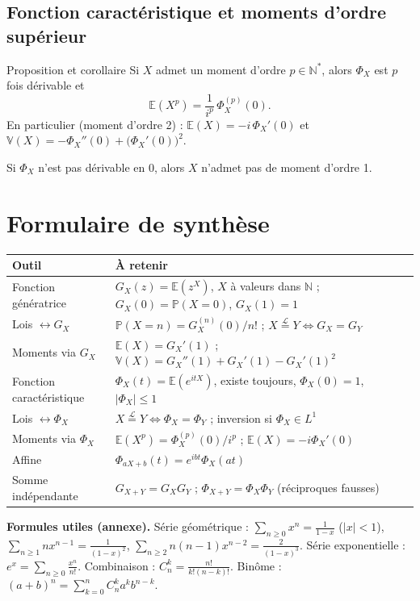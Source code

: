 \documentclass[11pt,a4paper]{article}
\newcommand{\E}{\mathbb{E}}
\newcommand{\V}{\mathbb{V}}
\renewcommand{\P}{\mathbb{P}}
\newcommand{\N}{\mathbb{N}}
\newcommand{\loi}{\overset{\mathcal L}{=}}
\begin{document}
\subsection{Fonction caractéristique et moments d'ordre supérieur}
\begin{thm}{Proposition et corollaire}
Si $X$ admet un moment d'ordre $p\in\N^*$, alors $\Phi_X$ est $p$ fois dérivable et
\[ \E(X^p)=\frac{1}{i^p}\,\Phi_X^{(p)}(0). \]
En particulier (moment d'ordre 2) : $\E(X)=-i\,\Phi_X'(0)$ et $\V(X)=-\Phi_X''(0)+\big(\Phi_X'(0)\big)^2$.

Si $\Phi_X$ n'est pas dérivable en $0$, alors $X$ n'admet pas de moment d'ordre 1.
\end{thm}

\section{Formulaire de synthèse}
\begin{center}
\renewcommand{\arraystretch}{1.4}
\begin{tabular}{@{}p{5.2cm}p{9cm}@{}}
\toprule
\textbf{Outil} & \textbf{À retenir}\\
\midrule
Fonction génératrice & $G_X(z)=\E(z^X)$, $X$ à valeurs dans $\N$ ; $G_X(0)=\P(X=0)$, $G_X(1)=1$\\
Lois $\leftrightarrow G_X$ & $\P(X=n)=G_X^{(n)}(0)/n!$ ; $X\loi Y\iff G_X=G_Y$\\
Moments via $G_X$ & $\E(X)=G_X'(1)$ ; $\V(X)=G_X''(1)+G_X'(1)-G_X'(1)^2$\\
Fonction caractéristique & $\Phi_X(t)=\E(e^{itX})$, existe toujours, $\Phi_X(0)=1$, $|\Phi_X|\le1$\\
Lois $\leftrightarrow\Phi_X$ & $X\loi Y\iff\Phi_X=\Phi_Y$ ; inversion si $\Phi_X\in L^1$\\
Moments via $\Phi_X$ & $\E(X^p)=\Phi_X^{(p)}(0)/i^p$ ; $\E(X)=-i\Phi_X'(0)$\\
Affine & $\Phi_{aX+b}(t)=e^{ibt}\Phi_X(at)$\\
Somme indépendante & $G_{X+Y}=G_XG_Y$ ; $\Phi_{X+Y}=\Phi_X\Phi_Y$ (réciproques fausses)\\
\bottomrule
\end{tabular}
\end{center}

\textbf{Formules utiles (annexe).} Série géométrique : $\sum_{n\ge0}x^n=\frac1{1-x}$ ($|x|<1$), $\sum_{n\ge1}nx^{n-1}=\frac1{(1-x)^2}$, $\sum_{n\ge2}n(n-1)x^{n-2}=\frac2{(1-x)^3}$. Série exponentielle : $e^x=\sum_{n\ge0}\frac{x^n}{n!}$. Combinaison : $C_n^k=\frac{n!}{k!(n-k)!}$. Binôme : $(a+b)^n=\sum_{k=0}^nC_n^ka^kb^{n-k}$.
\end{document}
